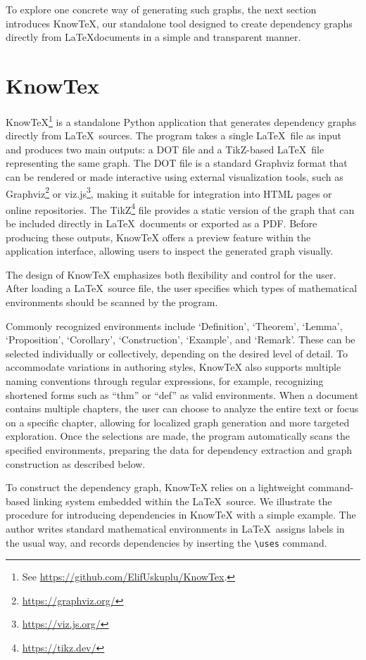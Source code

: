 \documentclass{article}
\begin{document}
To explore one concrete way of generating such graphs, the next section introduces KnowTeX, our standalone tool designed to create dependency graphs directly from \LaTeX documents in a simple and transparent manner.


\section{KnowTex}

KnowTeX\footnote{See \url{https://github.com/ElifUskuplu/KnowTex}.} is a standalone Python application that generates dependency graphs directly from \LaTeX\ sources. 
The program takes a single \LaTeX\ file as input and produces two main outputs: a DOT file and a TikZ-based \LaTeX\ file representing the same graph. 
The DOT file is a standard Graphviz format that can be rendered or made interactive using external visualization tools, such as Graphviz\footnote{\url{https://graphviz.org/}} or viz.js\footnote{\url{https://viz.js.org/}}, making it suitable for integration into HTML pages or online repositories. 
%
The TikZ\footnote{\url{https://tikz.dev/}} file provides a static version of the graph that can be included directly in \LaTeX\ documents or exported as a PDF.
Before producing these outputs, KnowTeX offers a preview feature within the application interface, allowing users to inspect the generated graph visually.

The design of KnowTeX emphasizes both flexibility and control for the user. After loading a \LaTeX\ source file, the user specifies which types of mathematical environments should be scanned by the program. 

Commonly recognized environments include `Definition', `Theorem', `Lemma', `Proposition', `Corollary', `Construction', `Example', and `Remark'. 
These can be selected individually or collectively, depending on the desired level of detail. 
To accommodate variations in authoring styles, KnowTeX also supports multiple naming conventions through regular expressions, for example, recognizing shortened forms such as “thm” or “def” as valid environments.
When a document contains multiple chapters, the user can choose to analyze the entire text or focus on a specific chapter, allowing for localized graph generation and more targeted exploration. 
Once the selections are made, the program automatically scans the specified environments, preparing the data for dependency extraction and graph construction as described below.

To construct the dependency graph, KnowTeX relies on a lightweight command-based linking system embedded within the \LaTeX\ source. We illustrate the procedure for introducing dependencies in KnowTeX with a simple example. The author writes standard mathematical environments in \LaTeX\, assigns labels in the usual way, and records dependencies by inserting the \verb|\uses| command.
\end{document}
